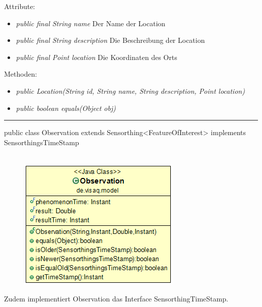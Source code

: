 Attribute:
\begin{itemize}
	\item \emph{public final String name} Der Name der Location
	\item \emph{public final String description} Die Beschreibung der Location
	\item \emph{public final Point location} Die Koordinaten des Orts
\end{itemize}
Methoden:
\begin{itemize}
	\item \emph{public Location(String id, String name, String description, Point location)} 
	\item \emph{public boolean equals(Object obj)} 
\end{itemize}

\rule{\textwidth}{0.4pt}
public class Observation extends Sensorthing<FeatureOfInterest> implements SensorthingsTimeStamp
\\\\
\begin{minipage}{0.3\textwidth}
	\begin{figure}[H]
		\includegraphics[scale = 0.5
		]{media/frontend/model/ObservationClass.png}
	\end{figure}
\end{minipage} \hfill
\begin{minipage}{0.6\textwidth}
	 Zudem implementiert Observation das Interface SensorthingTimeStamp.
\end{minipage}


